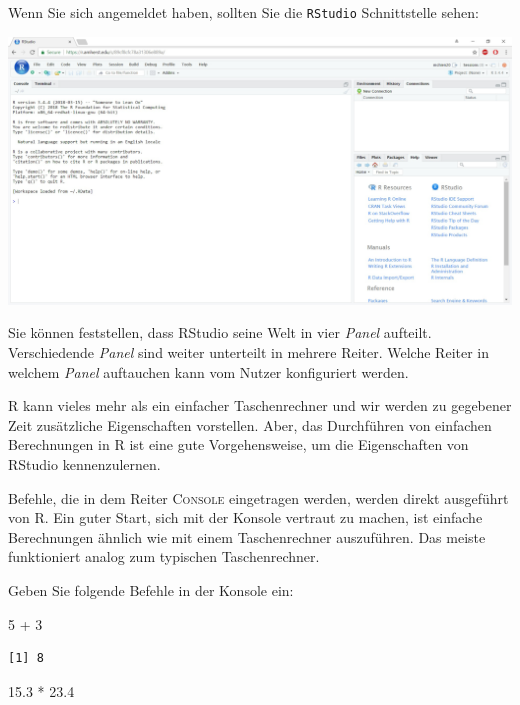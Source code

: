 \documentclass[
  ngerman,
]{scrbook}
\newenvironment{Shaded}{\begin{snugshade}}{\end{snugshade}}
\newcommand{\DecValTok}[1]{\textcolor[rgb]{0.00,0.00,0.81}{#1}}
\newcommand{\FloatTok}[1]{\textcolor[rgb]{0.00,0.00,0.81}{#1}}
\newcommand{\SpecialCharTok}[1]{\textcolor[rgb]{0.00,0.00,0.00}{#1}}
\begin{document}
\newpage

Wenn Sie sich angemeldet haben, sollten Sie die \texttt{RStudio} Schnittstelle sehen:

\begin{center}\includegraphics[width=\textwidth]{images/rstudio-cloud-interface} \end{center}

Sie können feststellen, dass \textsf{RStudio} seine Welt in vier \emph{Panel} aufteilt. Verschiedende \emph{Panel} sind weiter unterteilt in mehrere Reiter. Welche Reiter in welchem \emph{Panel} auftauchen kann vom Nutzer konfiguriert werden.

\textsf{R} kann vieles mehr als ein einfacher Taschenrechner und wir werden zu gegebener Zeit zusätzliche Eigenschaften vorstellen. Aber, das Durchführen von einfachen Berechnungen in \textsf{R} ist eine gute Vorgehensweise, um die Eigenschaften von \textsf{RStudio} kennenzulernen.

Befehle, die in dem Reiter \textsc{Console} eingetragen werden, werden direkt ausgeführt von \textsf{R}. Ein guter Start, sich mit der Konsole vertraut zu machen, ist einfache Berechnungen ähnlich wie mit einem Taschenrechner auszuführen. Das meiste funktioniert analog zum typischen Taschenrechner.

Geben Sie folgende Befehle in der Konsole ein:

\begin{Shaded}
\begin{Highlighting}[]
\DecValTok{5} \SpecialCharTok{+} \DecValTok{3}
\end{Highlighting}
\end{Shaded}

\begin{verbatim}
[1] 8
\end{verbatim}

\begin{Shaded}
\begin{Highlighting}[]
\FloatTok{15.3} \SpecialCharTok{*} \FloatTok{23.4}
\end{Highlighting}
\end{Shaded}
\end{document}
